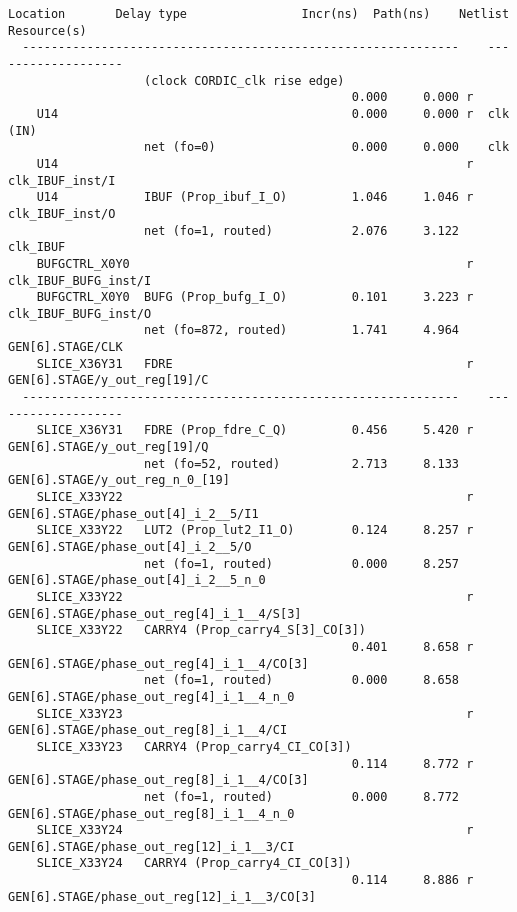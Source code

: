 \begin{Verbatim}[fontsize=\footnotesize,xleftmargin=-3.6cm]
    Location       Delay type                Incr(ns)  Path(ns)    Netlist Resource(s)
  -------------------------------------------------------------    -------------------
                   (clock CORDIC_clk rise edge)
                                                0.000     0.000 r
    U14                                         0.000     0.000 r  clk (IN)
                   net (fo=0)                   0.000     0.000    clk
    U14                                                         r  clk_IBUF_inst/I
    U14            IBUF (Prop_ibuf_I_O)         1.046     1.046 r  clk_IBUF_inst/O
                   net (fo=1, routed)           2.076     3.122    clk_IBUF
    BUFGCTRL_X0Y0                                               r  clk_IBUF_BUFG_inst/I
    BUFGCTRL_X0Y0  BUFG (Prop_bufg_I_O)         0.101     3.223 r  clk_IBUF_BUFG_inst/O
                   net (fo=872, routed)         1.741     4.964    GEN[6].STAGE/CLK
    SLICE_X36Y31   FDRE                                         r  GEN[6].STAGE/y_out_reg[19]/C
  -------------------------------------------------------------    -------------------
    SLICE_X36Y31   FDRE (Prop_fdre_C_Q)         0.456     5.420 r  GEN[6].STAGE/y_out_reg[19]/Q
                   net (fo=52, routed)          2.713     8.133    GEN[6].STAGE/y_out_reg_n_0_[19]
    SLICE_X33Y22                                                r  GEN[6].STAGE/phase_out[4]_i_2__5/I1
    SLICE_X33Y22   LUT2 (Prop_lut2_I1_O)        0.124     8.257 r  GEN[6].STAGE/phase_out[4]_i_2__5/O
                   net (fo=1, routed)           0.000     8.257    GEN[6].STAGE/phase_out[4]_i_2__5_n_0
    SLICE_X33Y22                                                r  GEN[6].STAGE/phase_out_reg[4]_i_1__4/S[3]
    SLICE_X33Y22   CARRY4 (Prop_carry4_S[3]_CO[3])
                                                0.401     8.658 r  GEN[6].STAGE/phase_out_reg[4]_i_1__4/CO[3]
                   net (fo=1, routed)           0.000     8.658    GEN[6].STAGE/phase_out_reg[4]_i_1__4_n_0
    SLICE_X33Y23                                                r  GEN[6].STAGE/phase_out_reg[8]_i_1__4/CI
    SLICE_X33Y23   CARRY4 (Prop_carry4_CI_CO[3])
                                                0.114     8.772 r  GEN[6].STAGE/phase_out_reg[8]_i_1__4/CO[3]
                   net (fo=1, routed)           0.000     8.772    GEN[6].STAGE/phase_out_reg[8]_i_1__4_n_0
    SLICE_X33Y24                                                r  GEN[6].STAGE/phase_out_reg[12]_i_1__3/CI
    SLICE_X33Y24   CARRY4 (Prop_carry4_CI_CO[3])
                                                0.114     8.886 r  GEN[6].STAGE/phase_out_reg[12]_i_1__3/CO[3]

\end{Verbatim}
